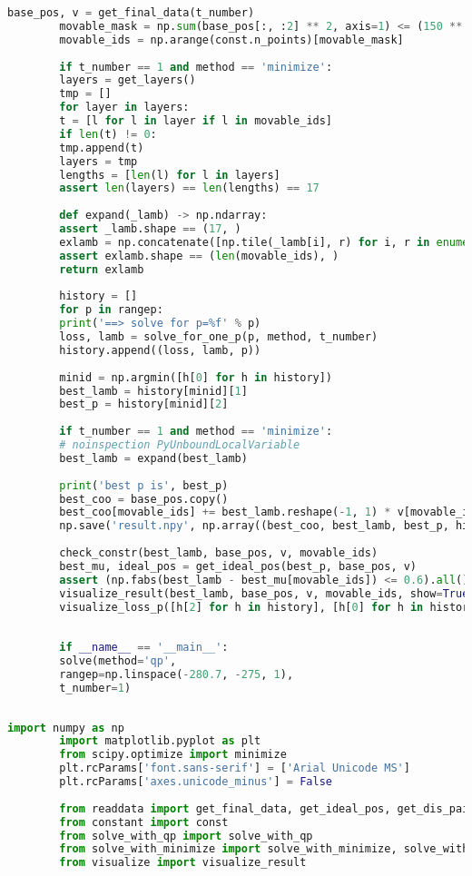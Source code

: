\documentclass[withoutpreface,bwprint,fontset=macnew]{cumcmthesis} %
\begin{document}
\begin{appendices}
\begin{lstlisting}[language=python]
		base_pos, v = get_final_data(t_number)
		movable_mask = np.sum(base_pos[:, :2] ** 2, axis=1) <= (150 ** 2)
		movable_ids = np.arange(const.n_points)[movable_mask]
		
		if t_number == 1 and method == 'minimize':
		layers = get_layers()
		tmp = []
		for layer in layers:
		t = [l for l in layer if l in movable_ids]
		if len(t) != 0:
		tmp.append(t)
		layers = tmp
		lengths = [len(l) for l in layers]
		assert len(layers) == len(lengths) == 17
		
		def expand(_lamb) -> np.ndarray:
		assert _lamb.shape == (17, )
		exlamb = np.concatenate([np.tile(_lamb[i], r) for i, r in enumerate([len(l) for l in layers])])
		assert exlamb.shape == (len(movable_ids), )
		return exlamb
		
		history = []
		for p in rangep:
		print('==> solve for p=%f' % p)
		loss, lamb = solve_for_one_p(p, method, t_number)
		history.append((loss, lamb, p))
		
		minid = np.argmin([h[0] for h in history])
		best_lamb = history[minid][1]
		best_p = history[minid][2]
		
		if t_number == 1 and method == 'minimize':
		# noinspection PyUnboundLocalVariable
		best_lamb = expand(best_lamb)
		
		print('best p is', best_p)
		best_coo = base_pos.copy()
		best_coo[movable_ids] += best_lamb.reshape(-1, 1) * v[movable_ids]
		np.save('result.npy', np.array((best_coo, best_lamb, best_p, history), dtype=object))
		
		check_constr(best_lamb, base_pos, v, movable_ids)
		best_mu, ideal_pos = get_ideal_pos(best_p, base_pos, v)
		assert (np.fabs(best_lamb - best_mu[movable_ids]) <= 0.6).all()
		visualize_result(best_lamb, base_pos, v, movable_ids, show=True, save=False, rotate=(t_number == 2))
		visualize_loss_p([h[2] for h in history], [h[0] for h in history], show=True, save=False)
		
		
		if __name__ == '__main__':
		solve(method='qp',
		rangep=np.linspace(-280.7, -275, 1),
		t_number=1)
		
	\end{lstlisting}

	\begin{lstlisting}[language=python]
		import numpy as np
		import matplotlib.pyplot as plt
		from scipy.optimize import minimize
		plt.rcParams['font.sans-serif'] = ['Arial Unicode MS']
		plt.rcParams['axes.unicode_minus'] = False
		
		from readdata import get_final_data, get_ideal_pos, get_dis_pairs, get_layers
		from constant import const
		from solve_with_qp import solve_with_qp
		from solve_with_minimize import solve_with_minimize, solve_with_minimize_all
		from visualize import visualize_result
		

\end{lstlisting}
\end{appendices}
\end{document}
